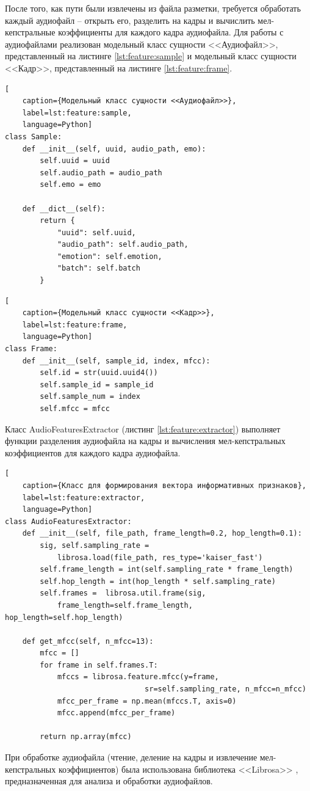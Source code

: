 После того, как пути были извлечены из файла разметки, требуется обработать каждый аудиофайл -- открыть его, разделить на кадры и вычислить мел-кепстральные коэффициенты для каждого кадра аудиофайла. Для работы с аудиофайлами реализован модельный класс сущности <<Аудиофайл>>, представленный на листинге \ref{lst:feature:sample} и модельный класс сущности <<Кадр>>, представленный на листинге \ref{lst:feature:frame}.
\begin{lstlisting}[
	caption={Модельный класс сущности <<Аудиофайл>>},
	label=lst:feature:sample,
	language=Python]
class Sample:
    def __init__(self, uuid, audio_path, emo):
        self.uuid = uuid
        self.audio_path = audio_path
        self.emo = emo
        
    def __dict__(self):
	    return {
	    	"uuid": self.uuid,
	    	"audio_path": self.audio_path,
	    	"emotion": self.emotion,
	    	"batch": self.batch
	    }
\end{lstlisting}

\begin{lstlisting}[
	caption={Модельный класс сущности <<Кадр>>},
	label=lst:feature:frame,
	language=Python]
class Frame:
    def __init__(self, sample_id, index, mfcc):
        self.id = str(uuid.uuid4())
        self.sample_id = sample_id
        self.sample_num = index
        self.mfcc = mfcc
\end{lstlisting}

Класс AudioFeaturesExtractor (листинг \ref{lst:feature:extractor}) выполняет функции разделения аудиофайла на кадры и вычисления мел-кепстральных коэффициентов для каждого кадра аудиофайла.
\begin{lstlisting}[
	caption={Класс для формирования вектора информативных признаков},
	label=lst:feature:extractor,
	language=Python]
class AudioFeaturesExtractor:
	def __init__(self, file_path, frame_length=0.2, hop_length=0.1):
		sig, self.sampling_rate = 
			librosa.load(file_path, res_type='kaiser_fast')
		self.frame_length = int(self.sampling_rate * frame_length)
		self.hop_length = int(hop_length * self.sampling_rate)
		self.frames =  librosa.util.frame(sig, 
			frame_length=self.frame_length, hop_length=self.hop_length)
		
	def get_mfcc(self, n_mfcc=13):
		mfcc = []
		for frame in self.frames.T:
			mfccs = librosa.feature.mfcc(y=frame, 
								sr=self.sampling_rate, n_mfcc=n_mfcc)
			mfcc_per_frame = np.mean(mfccs.T, axis=0)
			mfcc.append(mfcc_per_frame)

		return np.array(mfcc)
\end{lstlisting}
При обработке аудиофайла (чтение, деление на кадры и извлечение мел-кепстральных коэффициентов) была использована библиотека <<Librosa>> \cite{librosa}, предназначенная для анализа и обработки аудиофайлов. 

